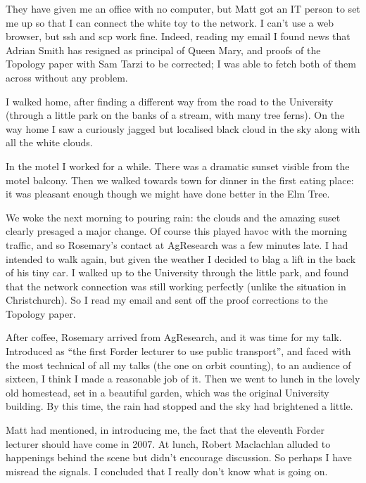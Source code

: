 \documentclass[12pt,a4paper]{article}
\begin{document}
They have
given me an office with no computer, but Matt got an IT person to set me
up so that I can connect the white toy to the  network. I can't use a
web browser, but ssh and scp work fine. Indeed, reading my email I found
news that Adrian Smith has resigned as principal of Queen Mary, and proofs
of the Topology paper with Sam Tarzi to be corrected; I was able to fetch
both of them across without any problem.


I walked home, after finding a different way from the road to the University
(through a little park on the banks of a stream, with many tree ferns). On
the way home I saw a curiously jagged but localised black cloud in the sky
along with all the white clouds.

In the motel I worked for a while. There was a dramatic sunset visible
from the motel balcony. Then we walked towards town for dinner in the
first eating place: it was pleasant enough though we might have done
better in the Elm Tree.

We woke the next morning to pouring rain: the clouds and the amazing suset
clearly presaged a major change. Of course this played havoc with the
morning traffic, and so Rosemary's contact at AgResearch was a few minutes
late. I had intended to walk again, but given the weather I decided to blag
a lift in the back of his tiny car. I walked up to the University through
the little park, and found that the network connection was still working
perfectly (unlike the situation in Christchurch). So I read my email and
sent off the proof corrections to the Topology paper.

After coffee, Rosemary arrived from AgResearch, and it was time for my
talk. Introduced as ``the first Forder lecturer to use public transport'',
and faced with the most technical of all my talks (the one on orbit
counting), to an audience of sixteen, I think I made a reasonable job
of it.  Then we went to lunch in the lovely old homestead, set in a beautiful
garden, which was the original University building. By this time, the rain
had stopped and the sky had brightened a little.

Matt had mentioned, in introducing me, the fact that the eleventh Forder
lecturer should have come in 2007. At lunch, Robert Maclachlan alluded to
happenings behind the scene but didn't encourage discussion. So perhaps
I have misread the signals. I concluded that I really don't know what is
going on.
\end{document}
